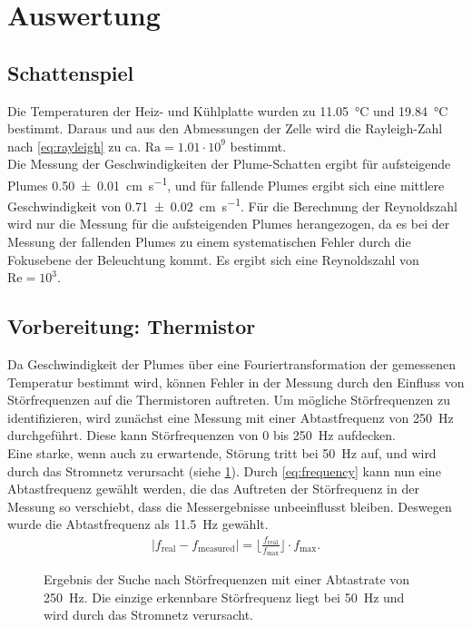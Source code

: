 \section{Auswertung}
\subsection{Schattenspiel}
Die Temperaturen der Heiz- und Kühlplatte wurden zu \SI{11.05}{\celsius} und \SI{19.84}{\celsius} bestimmt. Daraus und aus den Abmessungen der Zelle wird die Rayleigh-Zahl nach \cref{eq:rayleigh} zu ca. $\text{Ra} = 1.01\cdot 10^{9}$ bestimmt.
\\
Die Messung der Geschwindigkeiten der Plume-Schatten ergibt für aufsteigende Plumes \SI{0.50\pm0.01}{\centi\meter\per\second}, und für fallende Plumes ergibt sich eine mittlere Geschwindigkeit von \SI{0.71\pm0.02}{\centi\meter\per\second}.
Für die Berechnung der Reynoldszahl wird nur die Messung für die aufsteigenden Plumes herangezogen, da es bei der Messung der fallenden Plumes zu einem systematischen Fehler durch die Fokusebene der Beleuchtung kommt. Es ergibt sich eine Reynoldszahl von $\text{Re}=10^{3}$.
\\ %

\subsection{Vorbereitung: Thermistor}
Da Geschwindigkeit der Plumes über eine Fouriertransformation der gemessenen Temperatur bestimmt wird, können Fehler in der Messung durch den Einfluss von Störfrequenzen auf die Thermistoren auftreten.
Um mögliche Störfrequenzen zu identifizieren, wird zunächst eine Messung mit einer Abtastfrequenz von \SI{250}{\hertz} durchgeführt. 
Diese kann Störfrequenzen von 0 bis \SI{250}{\hertz} aufdecken.
\\
Eine starke, wenn auch zu erwartende, Störung tritt bei \SI{50}{\hertz} auf, und wird durch das Stromnetz verursacht (siehe \cref{fig:stoer}).
Durch \cref{eq:frequency} kann nun eine Abtastfrequenz gewählt werden, die das Auftreten der Störfrequenz in der Messung so verschiebt, dass die Messergebnisse unbeeinflusst bleiben. Deswegen wurde die Abtastfrequenz als \SI{11.5}{\hertz} gewählt.
\begin{align}
	|f_{\text{real}}- f_{\text{measured}} | = \lfloor\frac{f_{\text{real}}}{f_{\text{max}}}\rfloor \cdot f_{\text{max}}. \label{eq:frequency}
\end{align}
\begin{figure}
	\caption{Ergebnis der Suche nach Störfrequenzen mit einer Abtastrate von \SI{250}{\hertz}. Die einzige erkennbare Störfrequenz liegt bei \SI{50}{\hertz} und wird durch das Stromnetz verursacht.}\label{fig:stoer}
\end{figure}
\\


